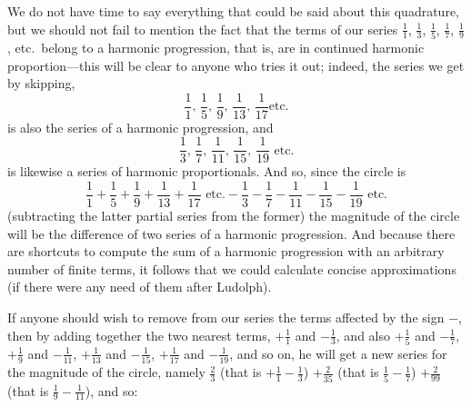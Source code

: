 \documentclass[twoside,openright]{article}
\begin{document}
We do not have time to say everything that could be said about this
quadrature, but we should not fail to mention the fact that the terms
of our series $\frac{1}{1}$, $\frac{1}{3}$, $ \frac{1}{5}$,
$\frac{1}{7}$, $\frac{1}{9}$, etc.\ belong to a harmonic progression,
that is, are in continued harmonic proportion---this will be clear to anyone who tries it
out; indeed, the series we get by skipping,
$$\frac{1}{1} \mbox{, } \frac{1}{5} \mbox{, }
\frac{1}{9} \mbox{, } \frac{1}{13} \mbox{, } \frac{1}{17} \mbox{
  etc.}$$ is also the series of a harmonic progression, and
$$\frac{1}{3} \mbox{, } \frac{1}{7} \mbox{, } \frac{1}{11} \mbox{, } \frac{1}{15} \mbox{, } \frac{1}{19}
\mbox{ etc.}$$ is likewise a series of harmonic proportionals.  And
so, since the circle is
$$\frac{1}{1} +\frac{1}{5} +
\frac{1}{9} + \frac{1}{13} + \frac{1}{17}\mbox{ etc.}-\frac{1}{3} -
\frac{1}{7} - \frac{1}{11} - \frac{1}{15} - \frac{1}{19}\mbox{ etc.}$$
(subtracting the latter partial series from the former) the magnitude
of the circle will be the difference of two series of a harmonic
progression.  And because there are shortcuts to compute the sum of a
harmonic progression with an arbitrary number of finite terms, it
follows that we could calculate concise approximations (if there were
any need of them after Ludolph).

If anyone should wish to remove from our series the terms affected by
the sign $-$, then by adding together the two nearest terms,
$+\frac{1}{1}$ and $ -\frac{1}{3}$, and also $+\frac{1}{5}$ and
$ - \frac{1}{7}$, $+\frac{1}{9}$ and $- \frac{1}{11}$, $+\frac{1}{13}$
and $ - \frac{1}{15}$, $+\frac{1}{17}$ and $ - \frac{1}{19}$, and so
on, he will get a new series for the magnitude of the circle, namely
$\frac{2}{3}$ (that is $+\frac{1}{1} - \frac{1}{3}$) $+ \frac{2}{35}$
(that is $\frac{1}{5} - \frac{1}{7}$) $+ \frac{2}{99}$ (that is
$\frac{1}{9} - \frac{1}{11}$), and so:

\begin{quote}
\end{quote}
\end{document}
